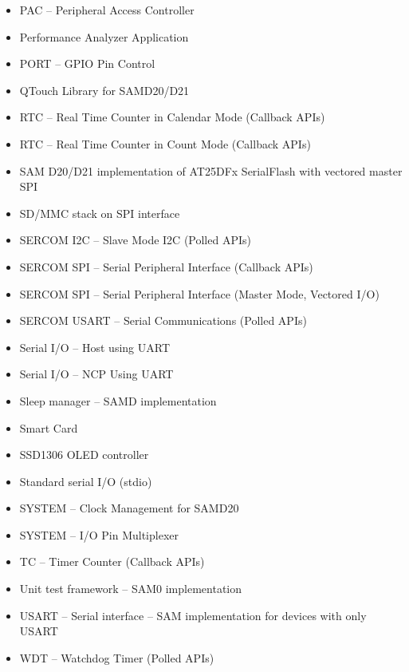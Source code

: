 \begin{multicols}{2}
\begin{itemize}
	\item PAC -- Peripheral Access Controller
	\item Performance Analyzer Application
	\item PORT -- GPIO Pin Control
	\item QTouch Library for SAMD20/D21
	\item RTC -- Real Time Counter in Calendar Mode (Callback APIs)
	\item RTC -- Real Time Counter in Count Mode (Callback APIs)
	\item SAM D20/D21 implementation of AT25DFx SerialFlash with vectored master SPI
	\item SD/MMC stack on SPI interface
	\item SERCOM I2C -- Slave Mode I2C (Polled APIs)
	\item SERCOM SPI -- Serial Peripheral Interface (Callback APIs)
	\item SERCOM SPI -- Serial Peripheral Interface (Master Mode, Vectored I/O)
	\item SERCOM USART -- Serial Communications (Polled APIs)
	\item Serial I/O -- Host using UART
	\item Serial I/O -- NCP Using UART
	\item Sleep manager -- SAMD implementation
	\item Smart Card
	\item SSD1306 OLED controller
	\item Standard serial I/O (stdio)
	\item SYSTEM -- Clock Management for SAMD20
	\item SYSTEM -- I/O Pin Multiplexer
	\item TC -- Timer Counter (Callback APIs)
	\item Unit test framework -- SAM0 implementation
	\item USART -- Serial interface -- SAM implementation for devices with only USART
	\item WDT -- Watchdog Timer (Polled APIs)
\end{itemize}
\end{multicols}


